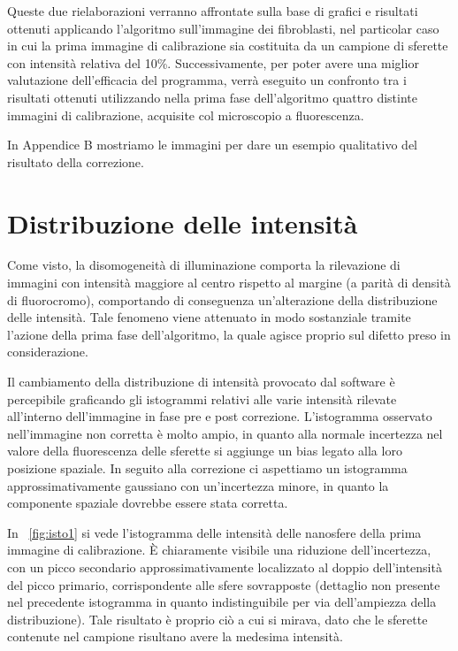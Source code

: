 Queste due rielaborazioni verranno affrontate sulla base di grafici e risultati ottenuti applicando l'algoritmo sull'immagine dei fibroblasti, nel particolar caso in cui la prima immagine di calibrazione sia costituita da un campione di sferette con intensità relativa del 10\%.
Successivamente, per poter avere una miglior valutazione dell'efficacia del programma, verrà eseguito un confronto tra i risultati ottenuti utilizzando nella prima fase dell'algoritmo quattro distinte immagini di calibrazione, acquisite col microscopio a fluorescenza.

In Appendice B mostriamo le immagini per dare un esempio qualitativo del risultato della correzione.

\section{Distribuzione delle intensità}

Come visto, la disomogeneità di illuminazione comporta la rilevazione di immagini con intensità maggiore al centro rispetto al margine (a parità di densità di fluorocromo), comportando di conseguenza un'alterazione della distribuzione delle intensità. 
Tale fenomeno viene attenuato in modo sostanziale tramite l'azione della prima fase dell'algoritmo, la quale agisce proprio sul difetto preso in considerazione.

Il cambiamento della distribuzione di intensità provocato dal software è percepibile graficando gli istogrammi relativi alle varie intensità rilevate all'interno dell'immagine in fase pre e post correzione.
L'istogramma osservato nell'immagine non corretta è molto ampio, in quanto alla normale incertezza nel valore della fluorescenza delle sferette si aggiunge un bias legato alla loro posizione spaziale.
In seguito alla correzione ci aspettiamo un istogramma approssimativamente gaussiano con un'incertezza minore, in quanto la componente spaziale dovrebbe essere stata corretta.

In \figurename~\ref{fig:isto1} si vede l'istogramma delle intensità delle nanosfere della prima immagine di calibrazione.
È chiaramente visibile una riduzione dell'incertezza, con un picco secondario approssimativamente localizzato al doppio dell'intensità del picco primario, corrispondente alle sfere sovrapposte (dettaglio non presente nel precedente istogramma in quanto indistinguibile per via dell'ampiezza della distribuzione).
Tale risultato è proprio ciò a cui si mirava, dato che le sferette contenute nel campione risultano avere la medesima intensità.

